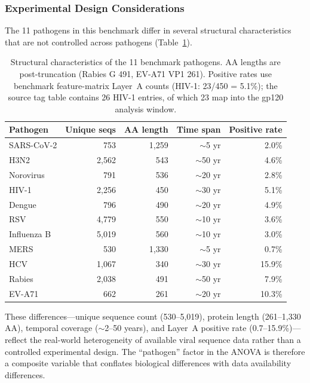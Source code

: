 \subsubsection{Experimental Design Considerations}
\label{sec:design_considerations}

The 11 pathogens in this benchmark differ in several structural characteristics that are not controlled across pathogens (Table~\ref{tab:design_characteristics}).

\begin{table}[htbp]
\centering
\caption[Structural characteristics of the 11 benchmark pathogens]{Structural characteristics of the 11 benchmark pathogens. AA lengths are post-truncation (Rabies G 491, EV-A71 VP1 261). Positive rates use benchmark feature-matrix Layer~A counts (HIV-1: 23/450 = 5.1\%); the source tag table contains 26 HIV-1 entries, of which 23 map into the gp120 analysis window.}
\label{tab:design_characteristics}
\small
\begin{tabular}{lrrrr}
\toprule
\textbf{Pathogen} & \textbf{Unique seqs} & \textbf{AA length} & \textbf{Time span} & \textbf{Positive rate} \\
\midrule
SARS-CoV-2 & 753 & 1,259 & $\sim$5 yr & 2.0\% \\
H3N2 & 2,562 & 543 & $\sim$50 yr & 4.6\% \\
Norovirus & 791 & 536 & $\sim$20 yr & 2.8\% \\
HIV-1 & 2,256 & 450 & $\sim$30 yr & 5.1\% \\
Dengue & 796 & 490 & $\sim$20 yr & 4.9\% \\
RSV & 4,779 & 550 & $\sim$10 yr & 3.6\% \\
Influenza B & 5,019 & 560 & $\sim$10 yr & 3.0\% \\
MERS & 530 & 1,330 & $\sim$5 yr & 0.7\% \\
HCV & 1,067 & 340 & $\sim$30 yr & 15.9\% \\
Rabies & 2,038 & 491 & $\sim$50 yr & 7.9\% \\
EV-A71 & 662 & 261 & $\sim$20 yr & 10.3\% \\
\bottomrule
\end{tabular}
\end{table}

These differences---unique sequence count (530--5,019), protein length (261--1,330 AA), temporal coverage ($\sim$2--50 years), and Layer~A positive rate (0.7--15.9\%)---reflect the real-world heterogeneity of available viral sequence data rather than a controlled experimental design. The ``pathogen'' factor in the ANOVA is therefore a composite variable that conflates biological differences with data availability differences.

